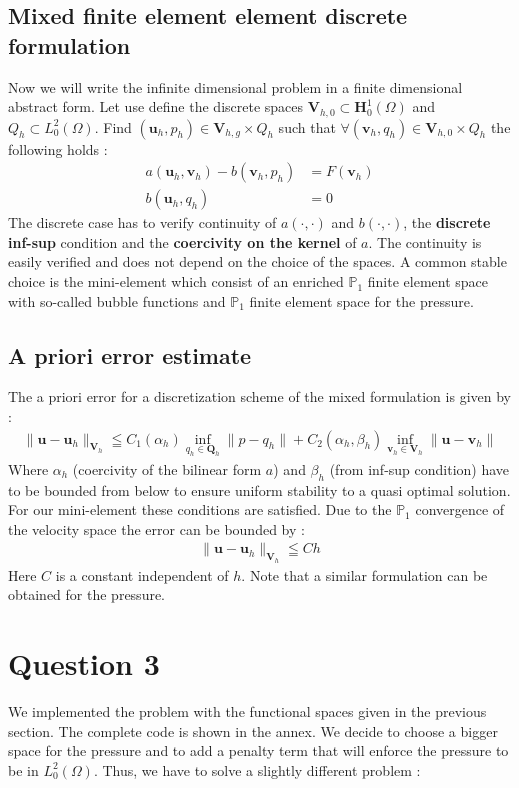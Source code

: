 \documentclass{article}
\begin{document}
\subsection*{Mixed finite element element discrete formulation}
Now we will write the infinite dimensional problem in a finite dimensional
abstract form. Let use define the discrete spaces $\mathbf{V}_{h,0} \subset \mathbf{H}^1_0(\Omega)$ and $Q_{h} \subset L^2_0(\Omega)$.
Find $(\mathbf{u}_h,p_h)\in \mathbf{V}_{h,g} \times Q_h$ such that
$\forall (\mathbf{v}_h,q_h)\in \mathbf{V}_{h,0} \times Q_{h}$ the
following holds :
\begin{align}
	a(\mathbf{u}_h,\mathbf{v}_h) - b(\mathbf{v}_h,p_h) &= F(\mathbf{v}_h) \\
	b(\mathbf{u}_h, q_h) &= 0 \nonumber
\end{align}
The discrete case has to verify continuity of $a(\cdot,\cdot)$ and $b(\cdot,\cdot)$, the \textbf{discrete inf-sup} condition and the \textbf{coercivity on the kernel} of $a$. The continuity is easily verified and does not depend on the choice of the spaces.
A common stable choice is the mini-element which consist of an enriched
$\mathbb{P}_1$ finite element space with so-called bubble functions and
$\mathbb{P}_1$ finite element space for the pressure.

\subsection*{A priori error estimate}
The a priori error for a discretization scheme of the mixed formulation is given by :
\begin{align}
	\| \mathbf{u} - \mathbf{u}_h \|_{\mathbf{V}_h}
	\leqq C_1(\alpha_h) \inf_{q_h \in \mathbf{Q}_h} \| p - q_h \|
	+ C_2(\alpha_h, \beta_h) \inf_{\mathbf{v}_h \in \mathbf{V}_h} \| \mathbf{u} - \mathbf{v}_h \|
\end{align}
Where $\alpha_h$ (coercivity of the bilinear form $a$) and $\beta_h$ (from
inf-sup condition) have to be bounded from below to ensure uniform stability to
a quasi optimal solution. For our mini-element these conditions are satisfied.
Due to the {$\mathbb{P}_1$} convergence of the velocity space the error can be
bounded by :
\begin{align}
	\| \mathbf{u} - \mathbf{u}_h \|_{\mathbf{V}_h} \leqq C h
\end{align}
Here $C$ is a constant independent of $h$. Note that a similar formulation can be obtained for the pressure. 

\section*{Question 3}
We implemented the problem with the functional spaces given in the previous
section. The complete code is shown in the annex. We decide to choose a bigger space for the pressure and to add a penalty term that will enforce the pressure to be in $L^2_0(\Omega)$.
Thus, we have to solve a slightly different problem :
\end{document}
